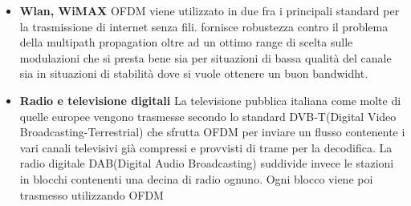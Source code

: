 \begin{itemize}
\begin{itemize}
\end{itemize}
\begin{itemize}
	\item \textbf{Wlan, WiMAX}
	  OFDM viene utilizzato in due fra i principali standard per la trasmissione di internet senza fili. fornisce robustezza contro il problema della multipath propagation oltre ad un ottimo range di scelta sulle modulazioni che si presta bene sia per situazioni di bassa qualità del canale sia in situazioni di stabilità dove si vuole ottenere un buon bandwidht.
\end{itemize}
\begin{itemize}
	\item \textbf{Radio e televisione digitali} La televisione pubblica italiana come molte di quelle europee vengono trasmesse secondo lo standard DVB-T(Digital Video Broadcasting-Terrestrial) che sfrutta OFDM per inviare un flusso contenente i vari canali televisivi già compressi e provvisti di trame per la decodifica. La radio digitale DAB(Digital Audio Broadcasting) suddivide invece le stazioni in blocchi contenenti una decina di radio ognuno. Ogni blocco viene poi trasmesso utilizzando OFDM
\end{itemize}


\end{itemize}
